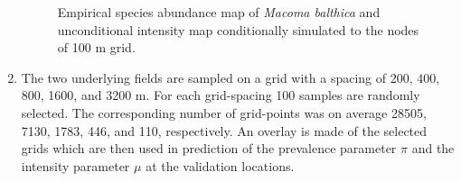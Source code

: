 \documentclass[review]{elsarticle}
\begin{document}
\begin{enumerate}
\begin{figure}[htbp]
\quad
{}
\caption{Empirical species abundance map of \textit{Macoma balthica} \protect{} and unconditional intensity map \protect{} conditionally simulated to the nodes of 100 m grid.}
\label{fig:rawfield}
\end{figure}

\item
The two underlying fields are sampled on a grid with a spacing of 200, 400, 800, 1600, and 3200 m. For each grid-spacing 100 samples are randomly selected. The corresponding number of grid-points was on average 28505, 7130, 1783, 446, and 110, respectively. 
An overlay is made of the selected grids which are then used in prediction of the prevalence parameter $\pi$ and the intensity parameter $\mu$ at the validation locations.


\end{enumerate}
\end{document}
